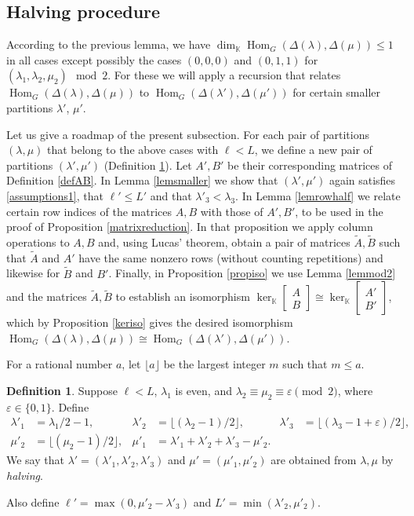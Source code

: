 \documentclass[11pt]{amsart}
\theoremstyle{remark}
\theoremstyle{definition}
\newtheorem{definition}[theorem]{Definition}
\newcommand{\Hom}{\operatorname{Hom}}
\newcommand{\D}{\Delta}
\newcommand{\la}{\lambda}
\newcommand{\K}{\mathbb K}
\numberwithin{equation}{section}
\begin{document}
\subsection{Halving procedure}	According to the previous lemma, we have $\dim_\K\Hom_G(\D(\la),\D(\mu)) \le 1$ in all cases except possibly  the cases $(0,0,0)$ and $(0,1,1)$ for $(\la_1, \la_2, \mu_2) \mod 2$. For these we will apply a recursion that relates $\Hom_G(\D(\la),\D(\mu))$ to $\Hom_G(\D(\la'),\D(\mu'))$ for certain smaller partitions $\la'$, $\mu'$.



Let us give a roadmap of the present subsection. For each pair of partitions $(\la, \mu)$ that belong to the above cases with $\ell < L$, we define a new pair of partitions $(\la', \mu')$ (Definition \ref{defhalf}). Let $A', B'$ be their corresponding matrices of Definition \ref{defAB}. In Lemma \ref{lemsmaller} we show that $(\la',\mu')$ again satisfies \eqref{assumptions1}, that $\ell'\le L'$ and that $\la'_3<\la_3$. In Lemma \ref{lemrowhalf} we relate certain row indices of the matrices $A, B$ with those of $A', B'$, to be used in the proof of Proposition \ref{matrixreduction}. In that proposition we apply column operations to $A, B$ and, using Lucas' theorem, obtain a pair of matrices $\widetilde A,\widetilde B$ such that $\widetilde A$ and $A'$ have the same nonzero rows (without counting repetitions) and likewise for $\widetilde B$ and $B'$. Finally, in Proposition \ref{propiso} we use Lemma \ref{lemmod2} and the matrices $\widetilde A, \widetilde B$ to establish an isomorphism $\ker_\K\left[\begin{smallmatrix}A\\B\end{smallmatrix}\right]
\cong \ker_\K\left[\begin{smallmatrix}A'\\B'\end{smallmatrix}\right]$, which by Proposition \ref{keriso} gives the desired isomorphism $\Hom_G(\D(\la),\D(\mu)) \cong \Hom_G(\D(\la'),\D(\mu'))$.


For a rational number $a$, let $\lfloor a \rfloor$ be the largest integer $m$ such that $m \le a$.
	\begin{definition}\label{defhalf}
		Suppose $\ell<L$, $\la_1$ is even, and
		$\la_2\equiv\mu_2\equiv\varepsilon\pmod2$, where
		$\varepsilon\in\{0,1\}$. Define
		\begin{align*}
			\la'_1&=\la_1/2-1,&
			\la'_2&=\lfloor(\la_2-1)/2\rfloor,&
			\la'_3&=\lfloor(\la_3-1+\varepsilon)/2\rfloor,\\
			\mu'_2&=\lfloor(\mu_2-1)/2\rfloor,&
			\mu'_1&=\la'_1+\la'_2+\la'_3-\mu'_2.
		\end{align*}
		We say that $\la'=(\la'_1,\la'_2,\la'_3)$ and
		$\mu'=(\mu'_1,\mu'_2)$ are obtained from $\la,\mu$ by
		\emph{halving}.

		Also define $\ell'=\max(0,\mu'_2-\la'_3)$ and
		$L'=\min(\la'_2,\mu'_2)$.
	\end{definition}
	
\end{document}
